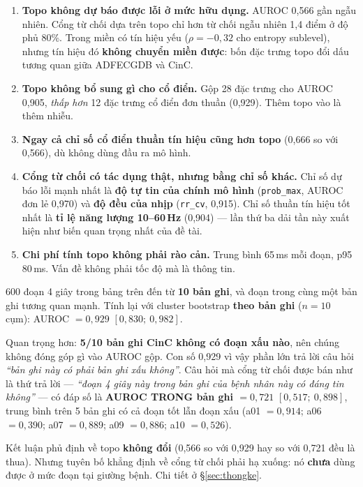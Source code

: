 \begin{enumerate}[leftmargin=1.6em,itemsep=5pt]
\item \textbf{Topo không dự báo được lỗi ở mức hữu dụng.} AUROC 0,566 gần ngẫu nhiên. Cổng từ chối dựa
trên topo chỉ hơn từ chối ngẫu nhiên 1,4 điểm ở độ phủ 80\%. Trong miền có tín hiệu yếu ($\rho = -0{,}32$
cho entropy sublevel), nhưng tín hiệu đó \textbf{không chuyển miền được}: bốn đặc trưng topo đổi dấu
tương quan giữa ADFECGDB và CinC.

\item \textbf{Topo không bổ sung gì cho cổ điển.} Gộp 28 đặc trưng cho AUROC 0,905, \textit{thấp hơn} 12
đặc trưng cổ điển đơn thuần (0,929). Thêm topo vào là thêm nhiễu.

\item \textbf{Ngay cả chỉ số cổ điển thuần tín hiệu cũng hơn topo} (0,666 so với 0,566), dù không dùng
đầu ra mô hình.

\item \textbf{Cổng từ chối có tác dụng thật, nhưng bằng chỉ số khác.} Chỉ số dự báo lỗi mạnh nhất là
\textbf{độ tự tin của chính mô hình} (\texttt{prob\_max}, AUROC đơn lẻ 0,970) và \textbf{độ đều của nhịp}
(\texttt{rr\_cv}, 0,915). Chỉ số thuần tín hiệu tốt nhất là \textbf{tỉ lệ năng lượng 10--60\,Hz}
(0,904) --- lần thứ ba dải tần này xuất hiện như biến quan trọng nhất của đề tài.

\item \textbf{Chi phí tính topo không phải rào cản.} Trung bình 65\,ms mỗi đoạn, p95 80\,ms. Vấn đề không
phải tốc độ mà là thông tin.
\end{enumerate}

\begin{canhbao}[title={Con số 0,929 trả lời sai câu hỏi --- đính chính bắt buộc của bản 3.3}]
600 đoạn 4 giây trong bảng trên đến từ \textbf{10 bản ghi}, và đoạn trong cùng một bản ghi tương quan
mạnh. Tính lại với cluster bootstrap \textbf{theo bản ghi} ($n = 10$ cụm): AUROC $= 0{,}929$
$[0{,}830;\ 0{,}982]$.

Quan trọng hơn: \textbf{5/10 bản ghi CinC không có đoạn xấu nào}, nên chúng không đóng góp gì vào AUROC
gộp. Con số 0,929 vì vậy phần lớn trả lời câu hỏi \textit{``bản ghi này có phải bản ghi xấu không''}.
Câu hỏi mà cổng từ chối được bán như là thứ trả lời --- \textit{``đoạn 4 giây này trong bản ghi của bệnh
nhân này có đáng tin không''} --- có đáp số là \textbf{AUROC TRONG bản ghi $= 0{,}721$}
$[0{,}517;\ 0{,}898]$, trung bình trên 5 bản ghi có cả đoạn tốt lẫn đoạn xấu (a01 $= 0{,}914$;
a06 $= 0{,}390$; a07 $= 0{,}889$; a09 $= 0{,}886$; a10 $= 0{,}526$).

Kết luận phủ định về topo \textbf{không đổi} (0,566 so với 0,929 hay so với 0,721 đều là thua). Nhưng
tuyên bố khẳng định về cổng từ chối phải hạ xuống: nó \textbf{chưa} dùng được ở mức đoạn tại giường bệnh.
Chi tiết ở \S\ref{sec:thongke}.
\end{canhbao}

